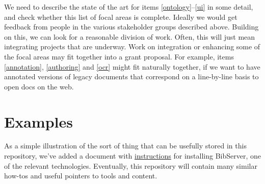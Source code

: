 \documentclass{article}
\begin{document}
We need to describe the state of the art for items \ref{ontology}--\ref{ui} in some detail, and check whether this list of focal areas is complete.  Ideally we would get feedback from people in the various stakeholder groups described above.  Building on this, we can look for a reasonable division of work.  Often, this will just mean integrating projects that are underway.  Work on integration or enhancing some of the focal areas may fit together into a grant proposal.  For example, items \ref{annotation}, \ref{authoring} and \ref{ocr} might fit naturally together, if we want to have annotated versions of legacy documents that correspond on a line-by-line basis to open docs on the web.

\section{Examples}

As a simple illustration of the sort of thing that can be usefully stored in this repository, we've added a document with \href{http://holtzermann17.github.io/skelodml/bibserver-setup.html}{instructions} for installing BibServer, one of the relevant technologies.  Eventually, this repository will contain many similar how-tos and useful pointers to tools and content.
\end{document}
